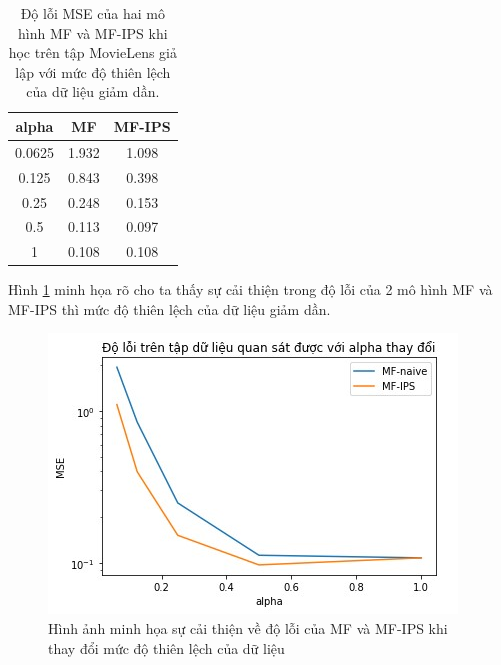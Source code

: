 \begin{table}[h]
    \centering
    \begin{tabular}{|c|c|c|}
    \hline
    alpha & MF & MF-IPS \\ \hline
    0.0625 & 1.932 & 1.098 \\ \hline
    0.125 & 0.843 & 0.398 \\ \hline
    0.25 & 0.248 & 0.153 \\ \hline
    0.5 & 0.113 & 0.097 \\ \hline
    1 & 0.108 & 0.108 \\ \hline
    \end{tabular}
    \caption{Độ lỗi MSE của hai mô hình MF và MF-IPS khi học trên tập MovieLens giả lập với mức độ thiên lệch của dữ liệu giảm dần.}
    \label{table:4_movielens}
\end{table}

Hình \ref{fig:4_movielens} minh họa rõ cho ta thấy sự cải thiện trong độ lỗi của 2 mô hình MF và MF-IPS thì mức độ thiên lệch của dữ liệu giảm dần.
\begin{figure}[h]
    \centering
    \includegraphics[width = \textwidth]{images/Chapter4/movielens.jpg}
    \caption{Hình ảnh minh họa sự cải thiện về độ lỗi của MF và MF-IPS khi thay đổi mức độ thiên lệch của dữ liệu}
    \label{fig:4_movielens}
\end{figure}

